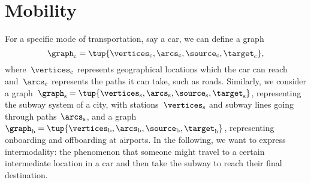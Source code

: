 

\section{Mobility}


For a specific mode of transportation, say a car, we can define a graph
\begin{equation*}
    \graph_\mathrm{c}=\tup{\vertices_\mathrm{c},\arcs_\mathrm{c},\source_\mathrm{c},\target_\mathrm{c}},
\end{equation*}
where~$\vertices_\mathrm{c}$ represents geographical locations which the car can reach and~$\arcs_\mathrm{c}$ represents the paths it can take, such as roads.
Similarly, we consider a graph~$\graph_\mathrm{s}=\tup{\vertices_\mathrm{s},\arcs_\mathrm{s},\source_\mathrm{s},\target_\mathrm{s}}$, representing the subway system of a city, with stations~$\vertices_\mathrm{s}$ and subway lines going through paths~$\arcs_\mathrm{s}$, and a graph $\graph_\mathrm{b}=\tup{\vertices_\mathrm{b},\arcs_\mathrm{b},\source_\mathrm{b},\target_\mathrm{b}}$, representing onboarding and offboarding at airports.
In the following, we want to express intermodality: the phenomenon that someone might travel to a certain intermediate location in a car and then take the subway to reach their final destination.

